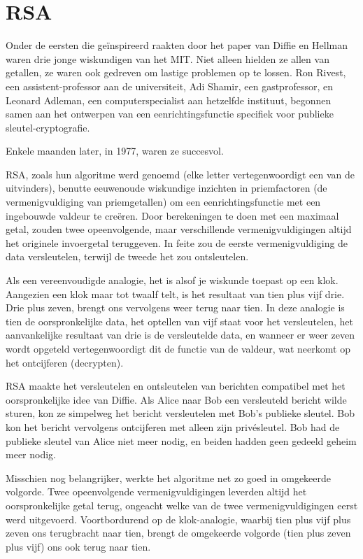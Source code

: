 \documentclass[
  a5paper,
  smalldemyvopaper,11pt,twoside,onecolumn,openright,extrafontsizes]{memoir}
\begin{document}
\section{RSA}\label{rsa}

Onder de eersten die geïnspireerd raakten door het paper van Diffie en
Hellman waren drie jonge wiskundigen van het MIT. Niet alleen hielden ze
allen van getallen, ze waren ook gedreven om lastige problemen op te
lossen. Ron Rivest, een assistent-professor aan de universiteit, Adi
Shamir, een gastprofessor, en Leonard Adleman, een computerspecialist
aan hetzelfde instituut, begonnen samen aan het ontwerpen van een
eenrichtingsfunctie specifiek voor publieke sleutel-cryptografie.

Enkele maanden later, in 1977, waren ze succesvol.

RSA, zoals hun algoritme werd genoemd (elke letter vertegenwoordigt een
van de uitvinders), benutte eeuwenoude wiskundige inzichten in
priemfactoren (de vermenigvuldiging van priemgetallen) om een
eenrichtingsfunctie met een ingebouwde valdeur te creëren. Door
berekeningen te doen met een maximaal getal, zouden twee opeenvolgende,
maar verschillende vermenigvuldigingen altijd het originele invoergetal
teruggeven. In feite zou de eerste vermenigvuldiging de data
versleutelen, terwijl de tweede het zou ontsleutelen.

Als een vereenvoudigde analogie, het is alsof je wiskunde toepast op een
klok. Aangezien een klok maar tot twaalf telt, is het resultaat van tien
plus vijf drie. Drie plus zeven, brengt ons vervolgens weer terug naar
tien. In deze analogie is tien de oorspronkelijke data, het optellen van
vijf staat voor het versleutelen, het aanvankelijke resultaat van drie
is de versleutelde data, en wanneer er weer zeven wordt opgeteld
vertegenwoordigt dit de functie van de valdeur, wat neerkomt op het
ontcijferen (decrypten).

RSA maakte het versleutelen en ontsleutelen van berichten compatibel met
het oorspronkelijke idee van Diffie. Als Alice naar Bob een versleuteld
bericht wilde sturen, kon ze simpelweg het bericht versleutelen met
Bob's publieke sleutel. Bob kon het bericht vervolgens ontcijferen met
alleen zijn privésleutel. Bob had de publieke sleutel van Alice niet
meer nodig, en beiden hadden geen gedeeld geheim meer nodig.

Misschien nog belangrijker, werkte het algoritme net zo goed in
omgekeerde volgorde. Twee opeenvolgende vermenigvuldigingen leverden
altijd het oorspronkelijke getal terug, ongeacht welke van de twee
vermenigvuldigingen eerst werd uitgevoerd. Voortbordurend op de
klok-analogie, waarbij tien plus vijf plus zeven ons terugbracht naar
tien, brengt de omgekeerde volgorde (tien plus zeven plus vijf) ons ook
terug naar tien.
\end{document}
